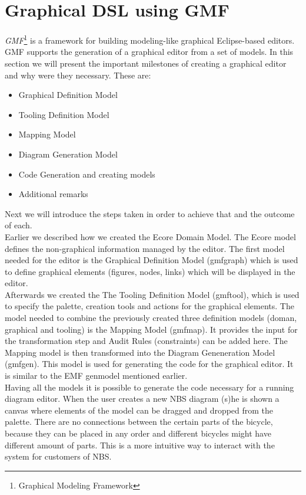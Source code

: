 \section{Graphical DSL using GMF}
\label{sec.gmf}

\noindent \emph{GMF}\footnote{Graphical Modeling Framework} is a framework for
building modeling-like graphical Eclipse-based editors.
\cite{Article_Introducing_GMF} GMF supports the generation of a graphical editor
from a set of models. In this section we will present the important
milestones of creating a graphical editor and why were they necessary. These
are:

\begin{itemize}
  \item Graphical Definition Model
  \item Tooling Definition Model
  \item Mapping Model
  \item Diagram Generation Model
  \item Code Generation and creating models
  \item Additional remarks
\end{itemize}
Next we will introduce the steps taken in order to achieve
that and the outcome of each.\\

\noindent Earlier we described how we created the Ecore Domain Model. The Ecore
model defines the non-graphical information managed by the editor. The first
model needed for the editor is the Graphical Definition Model (gmfgraph) which
is used to define graphical elements (figures, nodes, links)
which will be displayed in the editor. \\

\noindent Afterwards we created the The Tooling Definition Model (gmftool),
which is used to specify the palette, creation tools and actions for the
graphical elements. The model needed to combine the previously created three
definition models (doman, graphical and tooling) is the Mapping Model (gmfmap).
It provides the input for the transformation step and Audit Rules (constraints)
can be added here. The Mapping model is then transformed into the  Diagram
Geneneration Model (gmfgen). This model is used for generating the code for the graphical
editor. It is similar to the EMF genmodel mentioned earlier. \cite{GMF_Tutorial}\\

\noindent Having all the models it is possible to generate the code necessary
for a running diagram editor. When the user creates a new NBS diagram (s)he is
shown a canvas where elements of the model can be dragged and dropped from the
palette. There are no connections between the certain parts
of the bicycle, because they can be placed in any order and different bicycles
might have different amount of parts. This is a more intuitive way to interact
with the system for customers of NBS.\\

